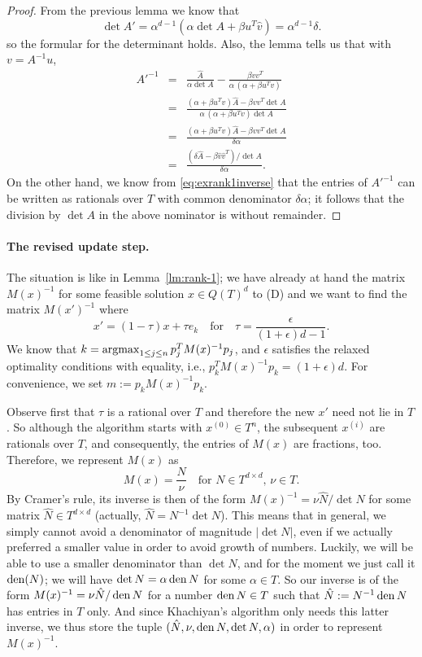 \documentclass[a4paper,twocolumn]{article}
\newcommand{\D}{\ensuremath{T}}%
\newcommand{\den}{\ensuremath{\mathop{\rm den}\nolimits}}
\newcommand{\argmax}{\ensuremath{\mathop{\rm argmax}\nolimits}}
\begin{document}
%
\begin{proof}
   From the previous lemma we know that
   \[ \det{A'} = \alpha^{d-1} (\alpha\det{A}+\beta u^T\hat{v})
               = \alpha^{d-1} \delta.
   \]
   so the formular for the determinant holds.  Also, the lemma tells
   us that with $v = A^{-1} u$,
   \begin{eqnarray*}
   A'^{-1} &=& \frac{\hat{A}}{\alpha \det{A}} -
               \frac{\beta vv^T}{\alpha\,(\alpha+\beta u^T v)} \\
           &=& \frac{(\alpha + \beta u^T v) \hat{A} - \beta vv^T\det{A}}%
               {\alpha\,(\alpha+\beta u^T v) \det{A}} \\
           &=& \frac{(\alpha + \beta u^T v) \hat{A} -
               \beta vv^T\det{A}}{\delta\alpha} \\
	   &=& \frac{(\delta \hat{A} - \beta
	       \hat{v}\hat{v}^T)/\det{A}}{\delta\alpha}.
   \end{eqnarray*}
   On the other hand, we know from \eqref{eq:exrank1inverse} that the
   entries of $A'^{-1}$ can be written as rationals over $T$ with
   common denominator $\delta\alpha$; it follows that the division by
   $\det{A}$ in the above nominator is without remainder.
\end{proof}
%
%
\paragraph{The revised update step.}
The situation is like in Lemma~\ref{lm:rank-1}; we have already at
hand the matrix $M(x)^{-1}$ for some feasible solution $x\in Q(\D)^d$
to (D) and we want to find the matrix $M(x')^{-1}$ where
\[
x' = (1-\tau) x+ \tau e_k \quad \mbox{for} \quad
\tau = \frac{\epsilon}{(1+\epsilon)d-1}.
\]
We know that $k=\argmax_{1\le j\le n} p_j^T M(x)^{-1} p_j$, and $\epsilon$
satisfies the relaxed optimality conditions with equality, i.e.,
$p_k^T M(x)^{-1} p_k = (1+\epsilon)d$.  For convenience, we set $m:=
p_k M(x)^{-1} p_k$.

Observe first that $\tau$ is a rational over $\D$ and therefore the
new $x'$ need not lie in $\D$.  So although the algorithm starts with
$x^{(0)}\in\D^n$, the subsequent $x^{(i)}$ are rationals over $T$, and
consequently, the entries of $M(x)$ are fractions, too.  Therefore, we
represent $M(x)$ as
\[
M(x) = \frac{N}{\nu}
\quad \mbox{for $N\in \D^{d\times d}$, $\nu\in T$}.
\]
By Cramer's rule, its inverse is then of the form $M(x)^{-1} = \nu
\hat{N}/\det{N}$ for some matrix $\hat{N}\in \D^{d\times d}$
(actually, $\hat{N} = N^{-1}\det{N}$).  This means that in general, we
simply cannot avoid a denominator of magnitude $|\det{N}|$, even if we
actually preferred a smaller value in order to avoid growth of
numbers.  Luckily, we will be able to use a smaller denominator than
$\det{N}$, and for the moment we just call it $\den(N)$; we will have
$\det{N} = \alpha \den{N}$ for some $\alpha\in T$.  So our inverse is
of the form $M(x)^{-1} = \nu\hat{N}/\den{N}$ for a number $\den{N}\in
T$ such that $\hat{N}:= N^{-1}\den{N}$ has entries in $T$ only.  And
since Khachiyan's algorithm only needs this latter inverse, we thus
store the tuple $(\hat{N},\nu,\den{N},\det{N},\alpha)$ in order to
represent $M(x)^{-1}$.
\end{document}
